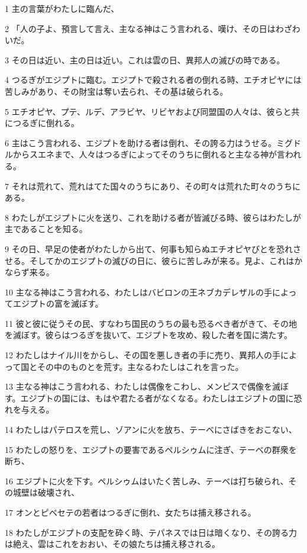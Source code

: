 \par 1 主の言葉がわたしに臨んだ、
\par 2 「人の子よ、預言して言え、主なる神はこう言われる、嘆け、その日はわざわいだ。
\par 3 その日は近い、主の日は近い。これは雲の日、異邦人の滅びの時である。
\par 4 つるぎがエジプトに臨む。エジプトで殺される者の倒れる時、エチオピヤには苦しみがあり、その財宝は奪い去られ、その基は破られる。
\par 5 エチオピヤ、プテ、ルデ、アラビヤ、リビヤおよび同盟国の人々は、彼らと共につるぎに倒れる。
\par 6 主はこう言われる、エジプトを助ける者は倒れ、その誇る力はうせる。ミグドルからスエネまで、人々はつるぎによってそのうちに倒れると主なる神が言われる。
\par 7 それは荒れて、荒れはてた国々のうちにあり、その町々は荒れた町々のうちにある。
\par 8 わたしがエジプトに火を送り、これを助ける者が皆滅びる時、彼らはわたしが主であることを知る。
\par 9 その日、早足の使者がわたしから出て、何事も知らぬエチオピヤびとを恐れさせる。そしてかのエジプトの滅びの日に、彼らに苦しみが来る。見よ、これはかならず来る。
\par 10 主なる神はこう言われる、わたしはバビロンの王ネブカデレザルの手によってエジプトの富を滅ぼす。
\par 11 彼と彼に従うその民、すなわち国民のうちの最も恐るべき者がきて、その地を滅ぼす。彼らはつるぎを抜いて、エジプトを攻め、殺した者を国に満たす。
\par 12 わたしはナイル川をからし、その国を悪しき者の手に売り、異邦人の手によって国とその中のものとを荒す。主なるわたしはこれを言った。
\par 13 主なる神はこう言われる、わたしは偶像をこわし、メンピスで偶像を滅ぼす。エジプトの国には、もはや君たる者がなくなる。わたしはエジプトの国に恐れを与える。
\par 14 わたしはパテロスを荒し、ゾアンに火を放ち、テーベにさばきをおこない、
\par 15 わたしの怒りを、エジプトの要害であるペルシゥムに注ぎ、テーベの群衆を断ち、
\par 16 エジプトに火を下す。ペルシゥムはいたく苦しみ、テーベは打ち破られ、その城壁は破壊され、
\par 17 オンとピベセテの若者はつるぎに倒れ、女たちは捕え移される。
\par 18 わたしがエジプトの支配を砕く時、テパネスでは日は暗くなり、その誇る力は絶え、雲はこれをおおい、その娘たちは捕え移される。
